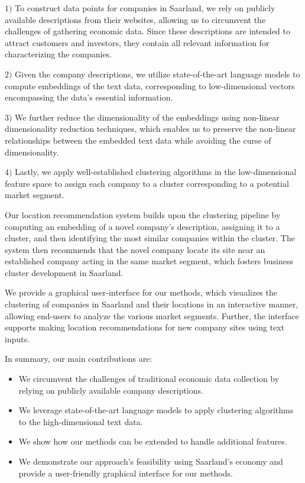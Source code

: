 \documentclass[conference]{IEEEtran}
\begin{document}
$1)$ To construct data points for companies in Saarland, we rely on publicly available descriptions from their websites, allowing us to circumvent the challenges of gathering economic data. Since these descriptions are intended to attract customers and investors, they contain all relevant information for characterizing the companies.

$2)$ Given the company descriptions, we utilize state-of-the-art language models to compute embeddings of the text data, corresponding to low-dimensional vectors encompassing the data's essential information. 

$3)$ We further reduce the dimensionality of the embeddings using non-linear dimensionality reduction techniques, which enables us to preserve the non-linear relationships between the embedded text data while avoiding the curse of dimensionality. 

$4)$ Lastly, we apply well-established clustering algorithms in the low-dimensional feature space to assign each company to a cluster corresponding to a potential market segment.

Our location recommendation system builds upon the clustering pipeline by computing an embedding of a novel company's description, assigning it to a cluster, and then identifying the most similar companies within the cluster. The system then recommends that the novel company locate its site near an established company acting in the same market segment, which fosters business cluster development in Saarland.

We provide a graphical user-interface for our methods, which visualizes the clustering of companies in Saarland and their locations in an interactive manner, allowing end-users to analyze the various market segments. Further, the interface supports making location recommendations for new company sites using text inputs.

In summary, our main contributions are:
\begin{itemize}
    \item We circumvent the challenges of traditional economic data collection by relying on publicly available company descriptions.
    \item We leverage state-of-the-art language models to apply clustering algorithms to the high-dimensional text data.
    \item We show how our methods can be extended to handle additional features.
    \item We demonstrate our approach's feasibility using Saarland's economy and provide a user-friendly graphical interface for our methods.
\end{itemize}
\end{document}
